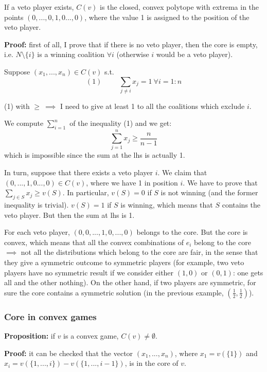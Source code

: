 \noindent If a veto player exists, $C(v)$ is the closed, convex polytope with extrema in the points $(0,...,0,1,0...,0)$, where the value 1 is assigned to the position of the veto player.

\bigskip
\noindent \textbf{Proof:} first of all, I prove that if there is 
no veto player, then the core is empty, i.e. $N\setminus\{i\}$ is a winning coalition 
$\forall i$ (otherwise $i$ would be a veto player).

\noindent Suppose $(x_1,...,x_n) \in C(v)$ s.t. 
\[(1) \hspace{1cm} \sum_{j \neq i}{x_j} = 1 ~\forall i=1:n\]

\noindent (1) with $\geq~\implies$ I need to give at least 1 to all the 
coalitions which exclude $i$.

\noindent We compute $\sum_{i=1}^n$ of the inequality (1) and we get:
\[
	\sum_{j=1}^n{x_j} \geq \frac{n}{n-1}
\]
which is impossible since the sum at the lhs is actually 1.

\noindent In turn, suppose that there exists a veto player $i$. We claim that 
$(0,...,1,0...,0) \in C(v)$, where we have 1 in position $i$. We have to prove 
that $\sum_{j \in S}{x_j} \geq v(S)$. In particular, $v(S)=0$ if $S$ is not 
winning (and the former inequality is trivial). $v(S)=1$ if $S$ is winning, 
which means that $S$ contains the veto player. But then the sum at lhs is 1.

\noindent For each veto player, $(0,0,...,1,0,...,0)$ belongs to the core. But 
the core is convex, which means that all the convex combinations of $e_i$ 
belong to the core $\implies$ not all the distributions which belong to the 
core are fair, in the sense that they give a symmetric outcome to symmetric 
players (for example, two veto players have no symmetric result if we consider 
either $(1,0)$ or $(0,1)$: one gets all and the other nothing). On the other 
hand, if two players are symmetric, for sure the core contains a symmetric 
solution (in the previous example, $(\frac{1}{2},\frac{1}{2})$). 

\subsubsection{Core in convex games}

\noindent \textbf{Proposition:} if $v$ is a convex game, $C(v) \neq \emptyset$.

\bigskip
\noindent \textbf{Proof:} it can be checked that the vector $(x_1,...,x_n)$, where $x_1 = v(\{1\})$ and $x_i = v(\{1,...,i\}) - v(\{1,...,i-1\})$, is in the core of $v$.

